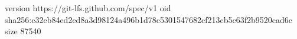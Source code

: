 version https://git-lfs.github.com/spec/v1
oid sha256:c32eb84ed2ed8a3d98124a496b1d78c5301547682cf213cb5c63f2b9520cad6c
size 87540
